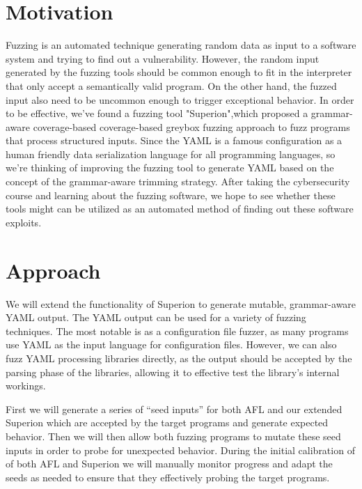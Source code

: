 \documentclass[12pt]{diazessay}
\begin{document}


\section*{Motivation}

Fuzzing is an automated technique generating random data as input to a software system and trying to find out a vulnerability.
However, the random input generated by the fuzzing tools should be common enough to fit in the interpreter that only accept a semantically valid program. On the other hand, the fuzzed input also need to be uncommon enough to trigger exceptional behavior.
In order to be effective, we've found a fuzzing tool "Superion"\cite{superion},which proposed a grammar-aware coverage-based coverage-based greybox fuzzing approach to fuzz programs that process structured inputs.
Since the YAML is a famous configuration as a human friendly data serialization language for all programming languages, so we're thinking of improving the fuzzing tool to generate YAML based on the concept of the grammar-aware trimming strategy.
After taking the cybersecurity course and learning about the fuzzing software, we hope to see whether these tools might can be utilized as an automated method of finding out these software exploits.


\section*{Approach}

We will extend the functionality of Superion to generate mutable, grammar-aware YAML output.
The YAML output can be used for a variety of fuzzing techniques.
The most notable is as a configuration file fuzzer, as many programs use YAML as the input language for configuration files.
However, we can also fuzz YAML processing libraries directly, as the output should be accepted by the parsing phase of the libraries, allowing it to effective test the library's internal workings.

First we will generate a series of ``seed inputs'' for both AFL and our extended Superion which are accepted by the target programs and generate expected behavior.
Then we will then allow both fuzzing programs to mutate these seed inputs \cite{Seed} in order to probe for unexpected behavior.
During the initial calibration of of both AFL and Superion we will manually monitor progress and adapt the seeds as needed to ensure that they effectively probing the target programs.
\end{document}
